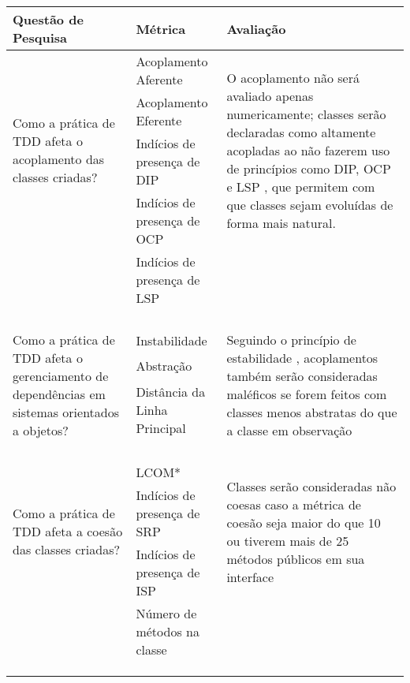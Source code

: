 \begin{table}[h!]
	\begin{tabular}{ | p{5cm} | p{5cm} | p{5cm} | }
		\hline
		Questão de Pesquisa & Métrica & Avaliação \\
		
		\hline
		
		\multirow{4}{5cm}{Como a prática de TDD afeta o acoplamento das classes criadas?} 
		& Acoplamento Aferente & \multirow{4}{5cm}{O acoplamento não será avaliado
		apenas numericamente; classes serão declaradas como altamente acopladas ao
		não fazerem uso de princípios como DIP, OCP e LSP \cite{bob-martin}, que
		permitem com que classes sejam evoluídas de forma mais natural.} \\ & Acoplamento Eferente
		& \\ & Indícios de presença de DIP & \\ & Indícios de presença de OCP & \\
		& Indícios de presença de LSP & \\
		& & \\ & & \\ & & \\ & & \\
		\hline
		
		\multirow{3}{5cm}{Como a prática de TDD afeta o gerenciamento de dependências em sistemas
		orientados a objetos?} 
		& Instabilidade & 
		\multirow{3}{5cm}{Seguindo o princípio de estabilidade \cite{bob-martin},
		acoplamentos também serão consideradas maléficos se forem feitos com classes menos abstratas 
		do que a classe em observação} \\ 
		& Abstração & \\ 
		& Distância da Linha Principal & \\
		& & \\ & & \\ & & \\ & & \\

		\hline
		
		\multirow{3}{5cm}{Como a prática de TDD afeta a coesão das classes criadas?} 
		& LCOM* & 
		\multirow{3}{5cm}{Classes serão consideradas não coesas caso a métrica de
		coesão seja maior do que 10 ou tiverem mais de 25 métodos
		públicos em sua interface} \\ 
		& Indícios de presença de SRP & \\ 
		& Indícios de presença de ISP & \\
		& Número de métodos na classe & \\
		& & \\ & & \\ & & \\
		\hline
		

\end{tabular}
\end{table}
